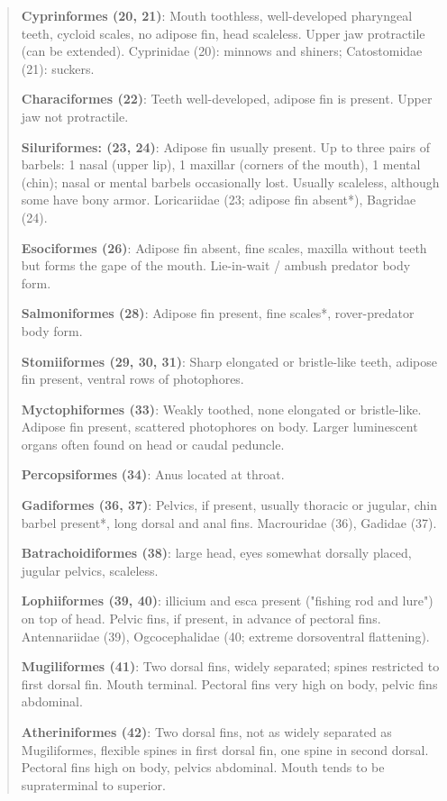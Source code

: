 \documentclass[12pt, hidelinks]{exam}
\begin{document}
\begin{quote}
\textbf{Cyprinformes (20, 21)}: Mouth toothless, well-developed
pharyngeal teeth, cycloid scales, no adipose fin, head scaleless. Upper
jaw protractile (can be extended). Cyprinidae (20): minnows and shiners;
Catostomidae (21): suckers.

\textbf{Characiformes (22)}: Teeth well-developed, adipose fin is
present. Upper jaw not protractile.

\textbf{Siluriformes: (23, 24)}: Adipose fin usually present. Up to
three pairs of barbels: 1 nasal (upper lip), 1 maxillar (corners of the
mouth), 1 mental (chin); nasal or mental barbels occasionally lost.
Usually scaleless, although some have bony armor. Loricariidae (23;
adipose fin absent*), Bagridae (24).

\textbf{Esociformes (26)}: Adipose fin absent, fine scales, maxilla
without teeth but forms the gape of the mouth. Lie-in-wait / ambush
predator body form.

\textbf{Salmoniformes (28)}: Adipose fin present, fine scales*,
rover-predator body form.

\textbf{Stomiiformes (29, 30, 31)}: Sharp elongated or bristle-like
teeth, adipose fin present, ventral rows of photophores.

\textbf{Myctophiformes (33)}: Weakly toothed, none elongated or
bristle-like. Adipose fin present, scattered photophores on body. Larger
luminescent organs often found on head or caudal peduncle.

\textbf{Percopsiformes} \textbf{(34)}: Anus located at throat.

\textbf{Gadiformes (36, 37)}: Pelvics, if present, usually thoracic or
jugular, chin barbel present*, long dorsal and anal fins. Macrouridae
(36), Gadidae (37).

\textbf{Batrachoidiformes (38)}: large head, eyes somewhat dorsally
placed, jugular pelvics, scaleless.

\textbf{Lophiiformes (39, 40)}: illicium and esca present ("fishing rod and lure") on top of head. Pelvic fins, if
present, in advance of pectoral fins. Antennariidae (39), Ogcocephalidae
(40; extreme dorsoventral flattening).

\textbf{Mugiliformes (41)}: Two dorsal fins, widely separated; spines
restricted to first dorsal fin. Mouth terminal. Pectoral fins very high
on body, pelvic fins abdominal.

\textbf{Atheriniformes (42)}: Two dorsal fins, not as widely separated
as Mugiliformes, flexible spines in first dorsal fin, one spine in
second dorsal. Pectoral fins high on body, pelvics abdominal. Mouth
tends to be supraterminal to superior.


\end{quote}
\end{document}
